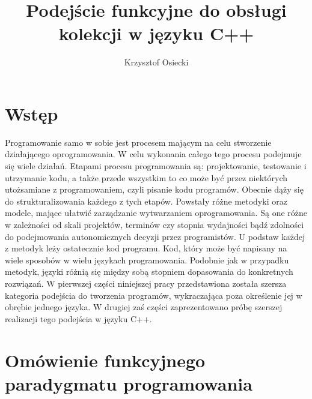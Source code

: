 \documentclass[a4paper,10pt]{report}
\title{Podejście funkcyjne do obsługi kolekcji w języku C++}
\author{Krzysztof Osiecki}
\begin{document}
\pagestyle{fancy}\lhead{}\rightmark

\maketitle
\tableofcontents{}
\chapter*{Wstęp}
Programowanie samo w sobie jest procesem mającym na celu stworzenie działającego oprogramowania. W celu wykonania całego tego procesu podejmuje się wiele działań. Etapami procesu programowania są: projektowanie, testowanie i utrzymanie kodu, a także przede wszystkim to co może być przez niektórych utożsamiane z programowaniem, czyli pisanie kodu programów. Obecnie dąży się do strukturalizowania każdego z tych etapów. Powstały różne metodyki oraz modele, mające ułatwić zarządzanie wytwarzaniem oprogramowania. Są one różne w zależności od skali projektów, terminów czy stopnia wydajności bądź zdolności do podejmowania autonomicznych decyzji przez programistów. U podstaw każdej z metodyk leży ostatecznie kod programu. Kod, który może być napisany na wiele sposobów w wielu językach programowania. Podobnie jak w przypadku metodyk, języki różnią się między sobą stopniem dopasowania do konkretnych rozwiązań. W pierwszej części niniejszej pracy przedstawiona została szersza kategoria podejścia do tworzenia programów, wykraczająca poza określenie jej w obrębie jednego języka. W drugiej zaś części zaprezentowano próbę szerszej realizacji tego podejścia w języku C++.
\chapter{Omówienie funkcyjnego paradygmatu programowania}
\end{document}

